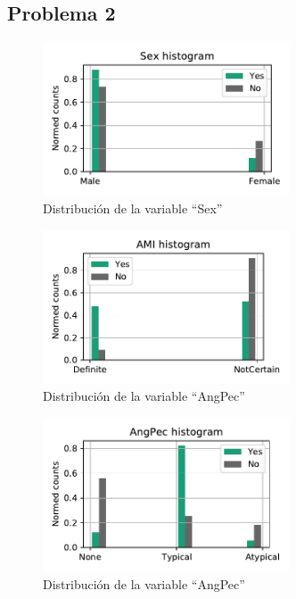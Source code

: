 \documentclass[11pt]{article}
\begin{document}
\subsection*{Problema 2}
\begin{figure}[H]
    \centering
    \includegraphics[width = 0.65\textwidth]{2-Sex-dist.pdf}
    \caption{Distribución de la variable ``Sex''}
    \label{2-Sex-dist}
\end{figure}
\begin{figure}[H]
    \centering
    \includegraphics[width = 0.65\textwidth]{2-AMI-dist.pdf}
    \caption{Distribución de la variable ``AngPec''}
    \label{2-AMI-dist}
\end{figure}
\begin{figure}[H]
    \centering
    \includegraphics[width = 0.65\textwidth]{2-AngPec-dist.pdf}
    \caption{Distribución de la variable ``AngPec''}
    \label{2-AngPec-dist}
\end{figure}
\end{document}
